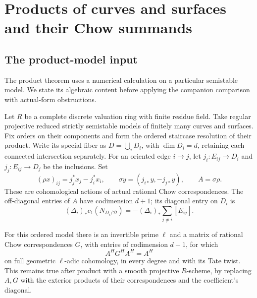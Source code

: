 \section{Products of curves and surfaces and their Chow summands}\label{sec:products}

\subsection{The product-model input}

The product theorem uses a numerical calculation on a particular
semistable model. We state its algebraic content before applying the
companion comparison with actual-form obstructions.

Let $R$ be a complete discrete valuation ring with finite residue field.
Take regular projective reduced strictly semistable models of finitely
many curves and surfaces. Fix orders on their components and form the
ordered staircase resolution of their product. Write its special fiber
as $D=\bigcup_iD_i$, with $\dim D_i=d$, retaining each connected
intersection separately. For an oriented edge $i\to j$, let
$j_i:E_{ij}\to D_i$ and $j_j:E_{ij}\to D_j$ be the inclusions. Set
\[
 (\rho x)_{ij}=j_j^*x_j-j_i^*x_i,\qquad
 \sigma y=(j_{i*}y,-j_{j*}y),\qquad A=\sigma\rho.
\]
These are cohomological actions of actual rational Chow correspondences.
The off-diagonal entries of $A$ have codimension $d+1$; its diagonal
entry on $D_i$ is
\[
 (\Delta_i)_*c_1(N_{D_i/\mathcal D})
       =-(\Delta_i)_*\sum_{j\ne i}[E_{ij}].
\]

\begin{proposition}\label{prop:product-model}
For this ordered model there is an invertible prime $\ell$ and a
matrix of rational Chow correspondences $G$, with entries of
codimension $d-1$, for which
\begin{equation}\label{eq:inner-inverse}
 A^H G^H A^H=A^H
\end{equation}
on full geometric $\ell$-adic cohomology, in every degree and with
its Tate twist. This remains true after product with a smooth
projective $R$-scheme, by replacing $A,G$ with the exterior products
of their correspondences and the coefficient's diagonal.
\end{proposition}

